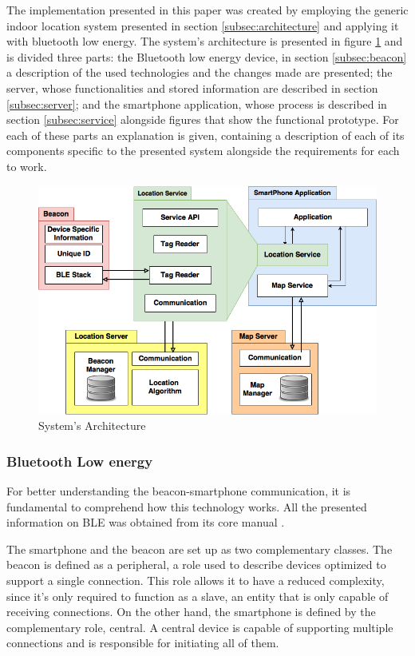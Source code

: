 \documentclass[a4paper]{IEEEtran}
\begin{document}
 
The implementation presented in this paper was created by employing the generic indoor location system presented in section \ref{subsec:architecture} and applying it with bluetooth low energy. The system's architecture is presented in figure \ref{fig:implementation} and is divided three parts: the Bluetooth low energy device, in section \ref{subsec:beacon} a description of the used technologies and the changes made are presented; the server, whose functionalities and stored information are described in section \ref{subsec:server}; and the smartphone application, whose process is described in section \ref{subsec:service} alongside figures that show the functional prototype. For each of these parts an explanation is given, containing a description of each of its components specific to the presented system alongside the requirements for each to work. 
 
 
\begin{figure} 
\centering 
\includegraphics[width=1\linewidth]{figures/implementation.png} 
\caption[System's Architecture]{System's Architecture} 
\label{fig:implementation} 
\end{figure} 
 
 
\subsubsection{Bluetooth Low energy} 
\label{subsec:ble} 
 
For better understanding the beacon-smartphone communication, it is fundamental to comprehend how this technology works. All the presented information on BLE was obtained from its core manual \cite{BLECore}.  

The smartphone and the beacon are set up as two complementary classes. The beacon is defined as a peripheral, a role used to describe devices optimized to support a single connection. This role allows it to have a reduced complexity, since it's only required to function as a slave, an entity that is only capable of receiving connections. On the other hand, the smartphone is defined by the complementary role, central. A central device is capable of supporting multiple connections and is responsible for initiating all of them. 
 
\end{document}

